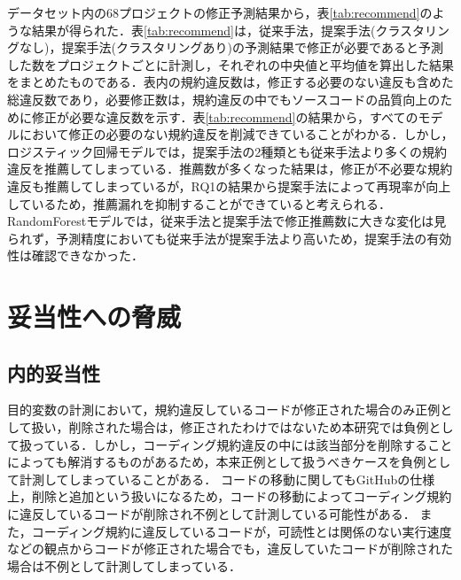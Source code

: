 \documentclass[submit,noauthor,ses,dvipdfmx]{ipsj}
\begin{document}
データセット内の68プロジェクトの修正予測結果から，表\ref{tab:recommend}のような結果が得られた．表\ref{tab:recommend}は，従来手法，提案手法(クラスタリングなし)，提案手法(クラスタリングあり)の予測結果で修正が必要であると予測した数をプロジェクトごとに計測し，それぞれの中央値と平均値を算出した結果をまとめたものである．表内の規約違反数は，修正する必要のない違反も含めた総違反数であり，必要修正数は，規約違反の中でもソースコードの品質向上のために修正が必要な違反数を示す．表\ref{tab:recommend}の結果から，すべてのモデルにおいて修正の必要のない規約違反を削減できていることがわかる．しかし，ロジスティック回帰モデルでは，提案手法の2種類とも従来手法より多くの規約違反を推薦してしまっている．推薦数が多くなった結果は，修正が不必要な規約違反も推薦してしまっているが，RQ1の結果から提案手法によって再現率が向上しているため，推薦漏れを抑制することができていると考えられる．RandomForestモデルでは，従来手法と提案手法で修正推薦数に大きな変化は見られず，予測精度においても従来手法が提案手法より高いため，提案手法の有効性は確認できなかった．


\section{妥当性への脅威}\label{chap:heuristic}
\subsection{内的妥当性}


目的変数の計測において，規約違反しているコードが修正された場合のみ正例として扱い，削除された場合は，修正されたわけではないため本研究では負例として扱っている．しかし，コーディング規約違反の中には該当部分を削除することによっても解消するものがあるため，本来正例として扱うべきケースを負例として計測してしまっていることがある．
コードの移動に関してもGitHubの仕様上，削除と追加という扱いになるため，コードの移動によってコーディング規約に違反しているコードが削除され不例として計測している可能性がある．
また，コーディング規約に違反しているコードが，可読性とは関係のない実行速度などの観点からコードが修正された場合でも，違反していたコードが削除された場合は不例として計測してしまっている．
\end{document}

